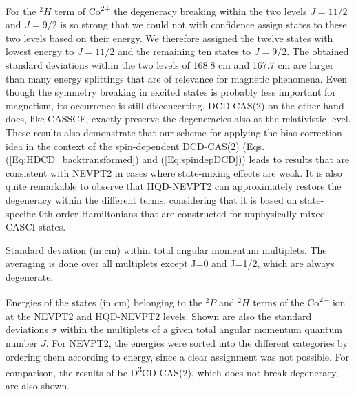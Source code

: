 For the $^2H$ term of Co\textsuperscript{2+} the degeneracy breaking within the two levels $J=11/2$ and $J=9/2$ is so strong that we could not with confidence assign states to these two levels based on their energy. We therefore assigned the twelve states with lowest energy to $J=11/2$ and the remaining ten states to $J=9/2$. The obtained standard deviations within the two levels of 168.8 cm\textsuperscript{} and 167.7 cm\textsuperscript{} are larger than many energy splittings that are of relevance for magnetic phenomena. Even though the symmetry breaking in excited states is probably less important for magnetism, its occurrence is still disconcerting. DCD-CAS(2) on the other hand does, like CASSCF, exactly preserve the degeneracies also at the relativistic level. These results also demonstrate that our scheme for applying the bias-correction idea in the context of the spin-dependent DCD-CAS(2) (Eqs. (\ref{Eq:HDCD_backtransformed}) and (\ref{Eq:spindepDCD})) leads to results that are consistent with NEVPT2 in cases where state-mixing effects are weak.
It is also quite remarkable to observe that HQD-NEVPT2 can approximately restore the degeneracy within the different terms, considering that it is based on state-specific 0th order Hamiltonians that are constructed for unphysically mixed CASCI states.
\begin{table}
\small
\centering
\ttabbox
{\caption[Standard deviation within total angular momentum multiplets.]{Standard deviation (in cm\textsuperscript{}) within total angular momentum multiplets. The averaging is done over all multiplets except J=0 and J=1/2, which are always degenerate.}
\label{Tab:NEV_QDNEV_STD}}
{}
\end{table}
\begin{table}
\small
\centering
\ttabbox
{\caption[Energies of the states belonging to the $^2P$ and $^2H$ terms of the Co\textsuperscript{2+} ion at the NEVPT2 and HQD-NEVPT2 levels.]{Energies of the states (in cm\textsuperscript{}) belonging to the $^2P$ and $^2H$ terms of the Co\textsuperscript{2+} ion at the NEVPT2 and HQD-NEVPT2 levels. Shown are also the standard deviations $\sigma$ within the multiplets of a given total angular momentum quantum number $J$. For NEVPT2, the energies were sorted into the different categories by ordering them according to energy, since a clear assignment was not possible. For comparison, the results of bc-D\textsuperscript{3}CD-CAS(2), which does not break degeneracy, are also shown.}
\label{Tab:degbreaking}}
{}
\end{table}

